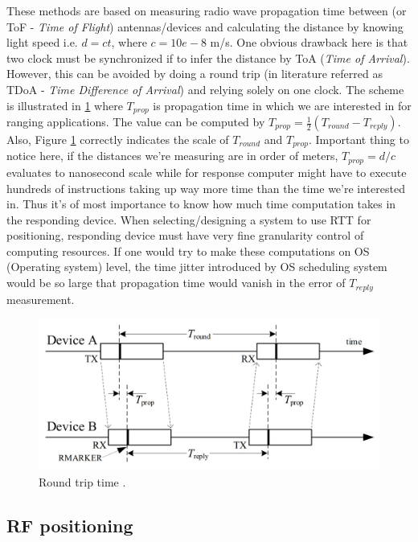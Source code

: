These methods are based on measuring radio wave propagation time between (or ToF - \emph{Time of Flight}) antennas/devices and calculating the distance by knowing light speed i.e. $d=ct$, where $c=10e-8$ m/s. One obvious drawback here is that two clock must be synchronized if to infer the distance by ToA (\emph{Time of Arrival}). However, this can be avoided by doing a round trip (in literature referred as TDoA - \emph{Time Difference of Arrival}) and relying solely on one clock. The scheme is illustrated in \ref{fig:RTT} where $T_{prop}$ is propagation time in which we are interested in for ranging applications. The value can be computed by $T_{prop} = \frac{1}{2}(T_{round} - T_{reply})$. Also, Figure \ref{fig:RTT} correctly indicates the scale of $T_{round}$ and $T_{prop}$. Important thing to notice here, if the distances we're measuring are in order of meters, $T_{prop} = d/c$ evaluates to nanosecond scale while for response computer might have to execute hundreds of instructions taking up way more time than the time we're interested in. Thus it's of most importance to know how much time computation takes in the responding device. When selecting/designing a system to use RTT for positioning, responding device must have very fine granularity control of computing resources. If one would try to make these computations on OS (Operating system) level, the time jitter introduced by OS scheduling system would be so large that propagation time would vanish in the error of $T_{reply}$ measurement.
\begin{figure}[H]
    \includegraphics[width=\linewidth]{figures/RTT.jpg}
    \caption{Round trip time \cite{9179124}.}
    \label{fig:RTT}
\end{figure}
  
\subsection{RF positioning}

